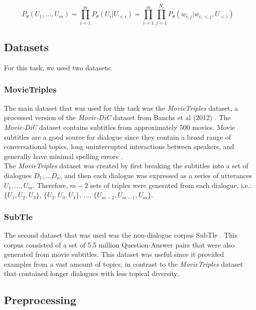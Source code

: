 \documentclass[11pt]{article}
\begin{document}
$$P_\theta(U_1, \dots, U_m) = \prod\limits_{i=1}^m P_\theta(U_i | U_{<i})= \prod\limits_{i=1}^m\prod\limits_{j=1}^{N_i} P_\theta(w_{i,j} | w_{i, <j}, U_{<i})$$

\subsection{Datasets}

For this task, we used two datasets:

\subsubsection{MovieTriples}

The main dataset that was used for this task was the {\it MovieTriples} dataset, a processed version of the {\it Movie-DiC} dataset from Banchs et al (2012) \cite{serban, banchs-iris}. The {\it Movie-DiC} dataset contains subtitles from approximately 500 movies. Movie subtitles are a good source for dialogue since they contain a broad range of conversational topics, long uninterrupted interactions between speakers, and generally have minimal spelling errors \cite{serban}. \\

\noindent The {\it MovieTriples} dataset was created by first breaking the subtitles into a set of dialogues $D_1, \dots D_n$, and then each dialogue was expressed as a series of utterances $U_1, \dots, U_m$. Therefore, $m-2$ sets of triples were generated from each dialogue, i.e.: $\{U_1, U_2, U_3\}$, $\{U_2, U_3, U_4\}$, $\dots$, $\{U_{m-2}, U_{m-1}, U_m\}$.

\subsubsection{SubTle}

The second dataset that was used was the non-dialogue corpus SubTle \cite{ameixa}. This corpus consisted of a set of 5.5 million Question-Answer pairs that were also generated from movie subtitles. This dataset was useful since it provided examples from a vast amount of topics, in contrast to the {\it MovieTriples} dataset that contained longer dialogues with less topical diversity.

\subsection{Preprocessing}
\end{document}
